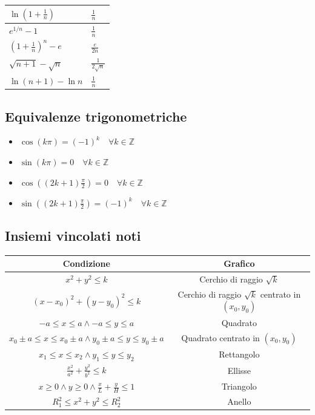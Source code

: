 \documentclass[10pt, a4paper]{article}
\begin{document}
\begin{center}
\begin{tabular}{|ll|}
                \hline
                $\displaystyle\ln\left(1+\frac{1}{n}\right)$ & $\displaystyle\frac{1}{n}$ \\
                \hline
                $\displaystyle e^{1/n} - 1$ & $\displaystyle\frac{1}{n}$ \\
                \hline
                $\displaystyle\left(1+\frac{1}{n}\right)^n - e$ & $\displaystyle\frac{e}{2n}$ \\
                \hline
                $\displaystyle\sqrt{n+1} - \sqrt{n}$ & $\displaystyle\frac{1}{2\sqrt{n}}$ \\
                \hline
                $\displaystyle\ln(n+1) - \ln n$ & $\displaystyle\frac{1}{n}$ \\
                \hline
            \end{tabular}
        \end{center}
    \subsection{Equivalenze trigonometriche}
        \begin{itemize}
            \item $\cos(k\pi) = (-1)^k \quad \forall k \in \mathbb{Z}$
            \item $\sin(k\pi) = 0 \quad \forall k \in \mathbb{Z}$
            \item $\cos((2k+1)\frac{\pi}{2}) = 0 \quad \forall k \in \mathbb{Z}$
            \item $\sin((2k+1)\frac{\pi}{2}) = (-1)^k \quad \forall k \in \mathbb{Z}$
        \end{itemize}
    \subsection{Insiemi vincolati noti}
    \begin{tabular}{|c|c|}
        \hline
        \textbf{Condizione} & \textbf{Grafico}\\
        \hline
        $x^2+y^2\leq k$ & Cerchio di raggio $\sqrt{k}$\\
        \hline
        $(x-x_0)^2+(y-y_0)^2\leq k$ & Cerchio di raggio $\sqrt{k}$ centrato in $(x_0,y_0)$\\
        \hline
        $-a\leq x \leq a \land -a\leq y\leq a$ & Quadrato\\
        \hline
        $x_0\pm a\leq x \leq x_0\pm a \land y_0\pm a\leq y\leq y_0\pm a$ & Quadrato centrato in $(x_0,y_0)$\\
        \hline
        $x_1\leq x \leq x_2\land y_1\leq y\leq y_2$ & Rettangolo\\
        \hline
        $\frac{x^2}{a^2}+\frac{y^2}{b^2}\leq k$ & Ellisse\\
        \hline
        $\displaystyle x\geq 0\land y\geq 0\land \frac{x}{L}+\frac{y}{H}\leq 1$ & Triangolo\\
        \hline
        $R_1^2\leq x^2+y^2\leq R_2^2$ & Anello\\
        \hline
    \end{tabular}
\end{document}
